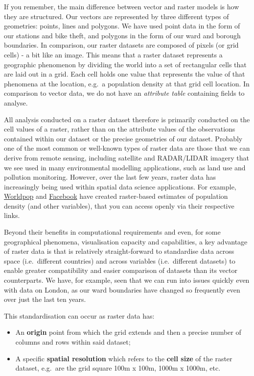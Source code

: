 \documentclass[
]{book}
\providecommand{\tightlist}{%
  \setlength{\itemsep}{0pt}\setlength{\parskip}{0pt}}
\begin{document}
If you remember, the main difference between vector and raster models is how they are structured. Our vectors are represented by three different types of geometries: points, lines and polygons. We have used point data in the form of our stations and bike theft, and polygons in the form of our ward and borough boundaries. In comparison, our raster datasets are composed of pixels (or grid cells) - a bit like an image. This means that a raster dataset represents a geographic phenomenon by dividing the world into a set of rectangular cells that are laid out in a grid. Each cell holds one value that represents the value of that phenomena at the location, e.g.~a population density at that grid cell location. In comparison to vector data, we do not have an \emph{attribute table} containing fields to analyse.

All analysis conducted on a raster dataset therefore is primarily conducted on the cell values of a raster, rather than on the attribute values of the observations contained within our dataset or the precise geometries of our dataset. Probably one of the most common or well-known types of raster data are those that we can derive from remote sensing, including satellite and RADAR/LIDAR imagery that we see used in many environmental modelling applications, such as land use and pollution monitoring. However, over the last few years, raster data has increasingly being used within spatial data science applications. For example, \href{www.worldpop.org}{Worldpop} and \href{https://dataforgood.fb.com/tools/population-density-maps/}{Facebook} have created raster-based estimates of population density (and other variables), that you can access openly via their respective links.

Beyond their benefits in computational requirements and even, for some geographical phenomena, visualisation capacity and capabilities, a key advantage of raster data is that is relatively straight-forward to standardise data across space (i.e.~different countries) and across variables (i.e.~different datasets) to enable greater compatibility and easier comparison of datasets than its vector counterparts. We have, for example, seen that we can run into issues quickly even with data on London, as our ward boundaries have changed so frequently even over just the last ten years.

This standardisation can occur as raster data has:

\begin{itemize}
\tightlist
\item
  An \textbf{origin} point from which the grid extends and then a precise number of columns and rows within said dataset;
\item
  A specific \textbf{spatial resolution} which refers to the \textbf{cell size} of the raster dataset, e.g.~are the grid square 100m x 100m, 1000m x 1000m, etc.
\end{itemize}
\end{document}
